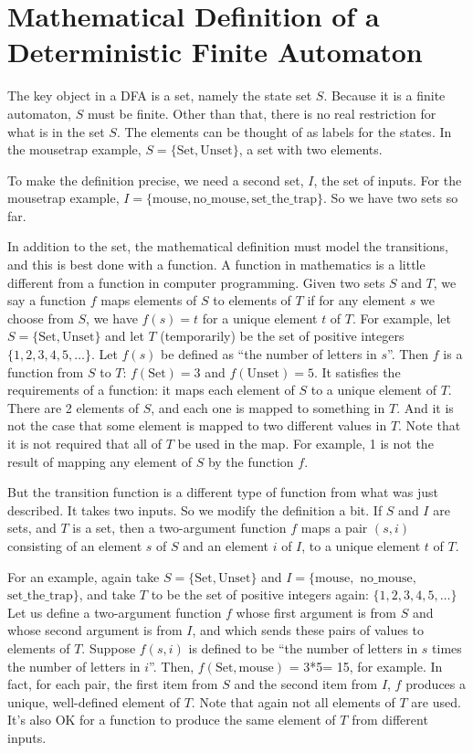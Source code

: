 \documentclass[letter,12pt]{article}
\begin{document}
\section{Mathematical Definition of a Deterministic Finite Automaton}

The key object in a DFA is a set, namely the state set $S$.  Because it is a finite automaton, $S$ must be finite.  Other than that, there is no real restriction for what is in the set $S$.  The elements can be thought of as labels for the states.  In the mousetrap example, $S = \{\textrm{Set}, \textrm{Unset}\}$, a set with two elements.

To make the definition precise, we need a second set, $I$, the set of inputs.  For the mousetrap example, $I=\{\textrm{mouse}, \textrm{no\_mouse}, \textrm{set\_the\_trap}\}$.  So we have two sets so far.

In addition to the set, the mathematical definition must model the transitions, and this is best done with a function.  A function in mathematics is a little different from a function in computer programming.  Given two sets $S$ and $T$, we say a function $f$ maps elements of $S$ to elements of $T$ if for any element $s$ we choose from $S$, we have $f(s) = t$ for a unique element $t$ of $T$.  For example, let $S = \{\textrm{Set}, \textrm{Unset}\}$ and let $T$ (temporarily) be the set of positive integers $\{1, 2, 3, 4, 5, \dots\}$.  Let $f(s)$ be defined as “the number of letters in $s$”.  Then $f$ is a function from $S$ to $T$: $f(\textrm{Set}) = 3$ and $f(\textrm{Unset}) = 5$.  It satisfies the requirements of a function: it maps each element of $S$ to a unique element of $T$.  There are 2 elements of $S$, and each one is mapped to something in $T$.  And it is not the case that some element is mapped to two different values in $T$.  Note that it is not required that all of $T$ be used in the map.  For example, 1 is not the result of mapping any element of $S$ by the function $f$.

But the transition function is a different type of function from what was just described.  It takes two inputs.  So we modify the definition a bit.  If $S$ and $I$ are sets, and $T$ is a set, then a two-argument function $f$ maps a pair $(s, i)$ consisting of an element $s$ of $S$ and an element $i$ of $I$, to a unique element $t$ of $T$.  

For an example, again take $S = \{\textrm{Set}, \textrm{Unset}\}$ and $I=\{\textrm{mouse},$ $\textrm{no\_mouse},$ $\textrm{set\_the\_trap}\}$, and take $T$ to be the set of positive integers again: $\{1, 2, 3, 4, 5, \dots\}$  Let us define a two-argument function $f$ whose first argument is from $S$ and whose second argument is from $I$, and which sends these pairs of values to elements of $T$.  Suppose $f(s, i)$ is defined to be “the number of letters in $s$ times the number of letters in $i$”.  Then, $f(\mathrm{Set}, \mathrm{mouse})$ = 3*5= 15, for example.  In fact, for each pair, the first item from $S$ and the second item from $I$, $f$ produces a unique, well-defined element of $T$.  Note that again not all elements of $T$ are used.  It’s also OK for a function to produce the same element of $T$ from different inputs.
\end{document}
